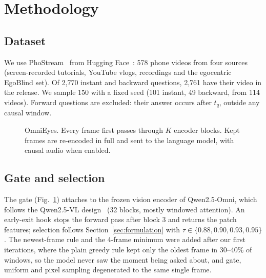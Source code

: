 \documentclass[conference]{IEEEtran}
\begin{document}
\section{Methodology}
\subsection{Dataset}
We use PhoStream~\cite{lu2026phostream} from Hugging Face~\cite{phostream_hf}: 578 phone videos from four sources (screen-recorded tutorials, YouTube vlogs, recordings and the egocentric EgoBlind set). Of 2{,}770 instant and backward questions, 2{,}761 have their video in the release. We sample 150 with a fixed seed (101 instant, 49 backward, from 114 videos). Forward questions are excluded: their answer occurs after $t_q$, outside any causal window.

\begin{figure}[t]
\centering
{}
\caption{OmniEyes. Every frame first passes through $K$ encoder blocks. Kept frames are re-encoded in full and sent to the language model, with causal audio when enabled.}
\label{fig:pipeline}
\end{figure}

\subsection{Gate and selection}
The gate (Fig.~\ref{fig:pipeline}) attaches to the frozen vision encoder of Qwen2.5-Omni, which follows the Qwen2.5-VL design~\cite{bai2025qwen25vl} (32 blocks, mostly windowed attention). An early-exit hook stops the forward pass after block 3 and returns the patch features; selection follows Section~\ref{sec:formulation} with $\tau\in\{0.88,0.90,0.93,0.95\}$. The newest-frame rule and the 4-frame minimum were added after our first iterations, where the plain greedy rule kept only the oldest frame in 30--40\% of windows, so the model never saw the moment being asked about, and gate, uniform and pixel sampling degenerated to the same single frame.
\end{document}
